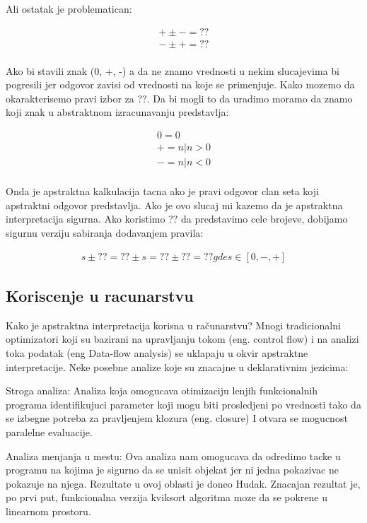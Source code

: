 \documentclass[a4paper]{article}
\begin{document}
{Ali ostatak je problematican:

\begin{multline}	
	+ \pm - = ?? \\ 
	- \pm + = ?? \\ 
\end{multline}

Ako bi stavili znak (0, +, -) a da ne znamo vrednosti u nekim slucajevima bi pogresili jer odgovor zavisi od vrednosti na koje se primenjuje. Kako mozemo da okarakterisemo pravi izbor za ??. Da bi mogli to da uradimo moramo da znamo koji znak u abstraktnom izracunavanju predstavlja:

\begin{multline}	
	0 = {0}				\\    
	+ = {n|n > 0}		\\	
	- = {n|n < 0}		\\
\end{multline}

Onda je apstraktna kalkulacija tacna ako je pravi odgovor clan seta koji apstraktni odgovor predstavlja. Ako je ovo slucaj mi kazemo da je apstraktna interpretacija sigurna. Ako koristimo ?? da predstavimo cele brojeve, dobijamo sigurnu verziju sabiranja dodavanjem pravila:

\begin{multline}	
	s \pm ?? = ?? \pm s = ?? \pm ?? = ??    gde s \in [0, -, +]
\end{multline}


\subsection{Koriscenje u racunarstvu}
\label{subsec:problem1}
Kako je apstraktna interpretacija korisna u računarstvu? Mnogi tradicionalni optimizatori koji su bazirani na upravljanju tokom (eng. control flow) i na analizi toka podatak (eng Data-flow analysis) se uklapaju u okvir apstraktne interpretacije. Neke posebne analize koje su znacajne u deklarativnim jezicima:

Stroga analiza:
Analiza koja omogucava otimizaciju lenjih  funkcionalnih programa identifikujuci parameter koji mogu biti prosledjeni po vrednosti tako da se izbegne potreba za pravljenjem klozura (eng. closure) I otvara se mogucnost paralelne evaluacije. 

Analiza menjanja u mestu:
Ova analiza nam omogucava da odredimo tacke u programu na kojima je sigurno da se unisit objekat jer ni jedna pokazivac ne pokazuje na njega. Rezultate u ovoj oblasti je doneo Hudak. Znacajan rezultat je, po prvi put, funkcionalna verzija kviksort algoritma moze da se pokrene u linearnom prostoru. \cite{Girard1987}

}
\end{document}
